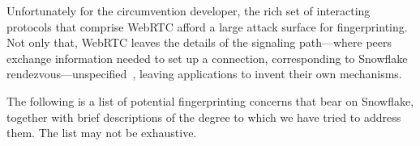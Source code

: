 \documentclass[letterpaper,twocolumn]{article}
\begin{document}
Unfortunately for the circumvention developer,
the rich set of interacting protocols that comprise WebRTC
afford a large attack surface for fingerprinting.
Not only that, WebRTC leaves the details of
the signaling path---where peers exchange information
needed to set up a connection,
corresponding to Snowflake rendezvous---unspecified~\cite[\S 3]{rfc8825},
leaving applications to invent their own mechanisms.

The following is a list of potential fingerprinting concerns
that bear on Snowflake, together with brief descriptions
of the degree to which we have tried to address them.
The list may not be exhaustive.
\end{document}
